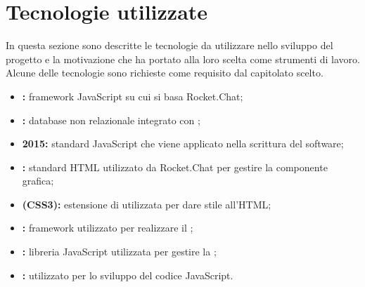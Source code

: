 \section{Tecnologie utilizzate}
In questa sezione sono descritte le tecnologie da utilizzare nello sviluppo del progetto \ProjectName{} e la motivazione che ha portato alla loro scelta come strumenti di lavoro. Alcune delle tecnologie sono richieste come requisito dal capitolato scelto.
\begin{itemize}
	\item \textbf{:} framework JavaScript su cui si basa Rocket.Chat;
	\item \textbf{:} database non relazionale integrato con ;
	\item \textbf{ 2015:} standard JavaScript che viene applicato nella scrittura del software;
	\item \textbf{:} standard HTML utilizzato da Rocket.Chat per gestire la componente grafica;
	\item \textbf{ (CSS3):} estensione di  utilizzata per dare stile all'HTML; 
	\item \textbf{:} framework utilizzato per realizzare il ;
	\item \textbf{:} libreria JavaScript utilizzata per gestire la ;
	\item \textbf{:}  utilizzato per lo sviluppo del codice JavaScript.
\end{itemize}

